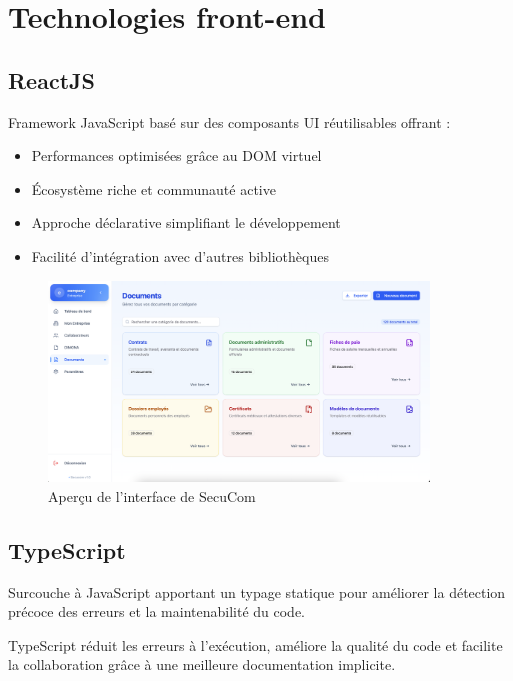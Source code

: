 \newpage
\section{Technologies front-end}

\subsection{ReactJS}
\noindent Framework JavaScript basé sur des composants UI réutilisables offrant :
\begin{itemize}[leftmargin=*,label=\textcolor{darkgray}{$\bullet$},itemsep=0.3em]
  \item Performances optimisées grâce au DOM virtuel
  \item Écosystème riche et communauté active
  \item Approche déclarative simplifiant le développement
  \item Facilité d'intégration avec d'autres bibliothèques
\end{itemize}

\begin{figure}[H]
  \centering
  \includegraphics[width=0.9\textwidth]{SecuComPreviewDocs.png}
  \caption{Aperçu de l'interface de SecuCom}
  \label{fig:secucomPreview}
\end{figure}

\subsection{TypeScript}
\noindent Surcouche à JavaScript apportant un typage statique pour améliorer la détection précoce des erreurs et la maintenabilité du code.

\begin{note}
TypeScript réduit les erreurs à l'exécution, améliore la qualité du code et facilite la collaboration grâce à une meilleure documentation implicite.
\end{note}

